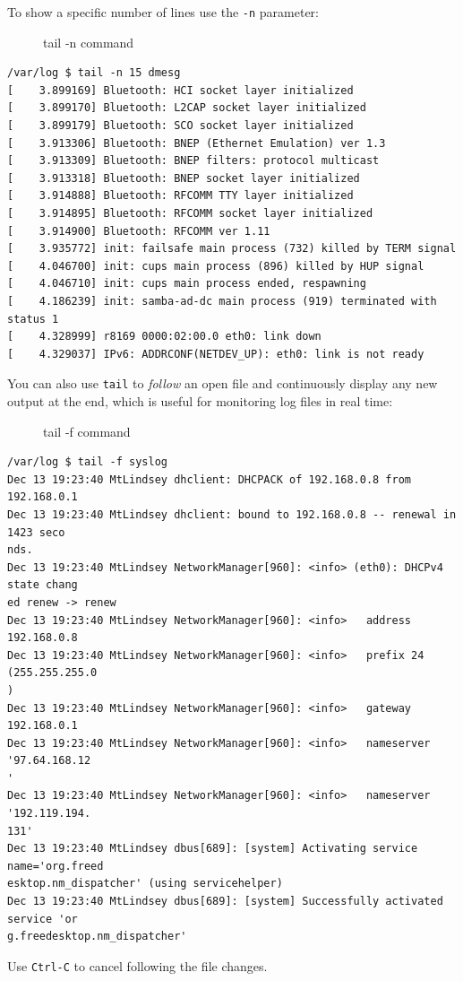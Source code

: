 \documentclass[10pt,]{book}
\numberwithin{figure}{chapter}
\DeclareRobustCommand{\drcap}[1]{\begin{figure}[H]\caption{#1}\end{figure}}
\begin{document}
To show a specific number of lines use the \texttt{-n} parameter:

\drcap{tail -n command}

\begin{verbatim}
/var/log $ tail -n 15 dmesg
[    3.899169] Bluetooth: HCI socket layer initialized
[    3.899170] Bluetooth: L2CAP socket layer initialized
[    3.899179] Bluetooth: SCO socket layer initialized
[    3.913306] Bluetooth: BNEP (Ethernet Emulation) ver 1.3
[    3.913309] Bluetooth: BNEP filters: protocol multicast
[    3.913318] Bluetooth: BNEP socket layer initialized
[    3.914888] Bluetooth: RFCOMM TTY layer initialized
[    3.914895] Bluetooth: RFCOMM socket layer initialized
[    3.914900] Bluetooth: RFCOMM ver 1.11
[    3.935772] init: failsafe main process (732) killed by TERM signal
[    4.046700] init: cups main process (896) killed by HUP signal
[    4.046710] init: cups main process ended, respawning
[    4.186239] init: samba-ad-dc main process (919) terminated with status 1
[    4.328999] r8169 0000:02:00.0 eth0: link down
[    4.329037] IPv6: ADDRCONF(NETDEV_UP): eth0: link is not ready
\end{verbatim}

You can also use \texttt{tail} to \emph{follow} an open file and
continuously display any new output at the end, which is useful for
monitoring log files in real time:

\drcap{tail -f command}

\begin{verbatim}
/var/log $ tail -f syslog
Dec 13 19:23:40 MtLindsey dhclient: DHCPACK of 192.168.0.8 from 192.168.0.1
Dec 13 19:23:40 MtLindsey dhclient: bound to 192.168.0.8 -- renewal in 1423 seco
nds.
Dec 13 19:23:40 MtLindsey NetworkManager[960]: <info> (eth0): DHCPv4 state chang
ed renew -> renew
Dec 13 19:23:40 MtLindsey NetworkManager[960]: <info>   address 192.168.0.8
Dec 13 19:23:40 MtLindsey NetworkManager[960]: <info>   prefix 24 (255.255.255.0
)
Dec 13 19:23:40 MtLindsey NetworkManager[960]: <info>   gateway 192.168.0.1
Dec 13 19:23:40 MtLindsey NetworkManager[960]: <info>   nameserver '97.64.168.12
'
Dec 13 19:23:40 MtLindsey NetworkManager[960]: <info>   nameserver '192.119.194.
131'
Dec 13 19:23:40 MtLindsey dbus[689]: [system] Activating service name='org.freed
esktop.nm_dispatcher' (using servicehelper)
Dec 13 19:23:40 MtLindsey dbus[689]: [system] Successfully activated service 'or
g.freedesktop.nm_dispatcher'
\end{verbatim}

Use \texttt{Ctrl-C} to cancel following the file changes.
\end{document}
